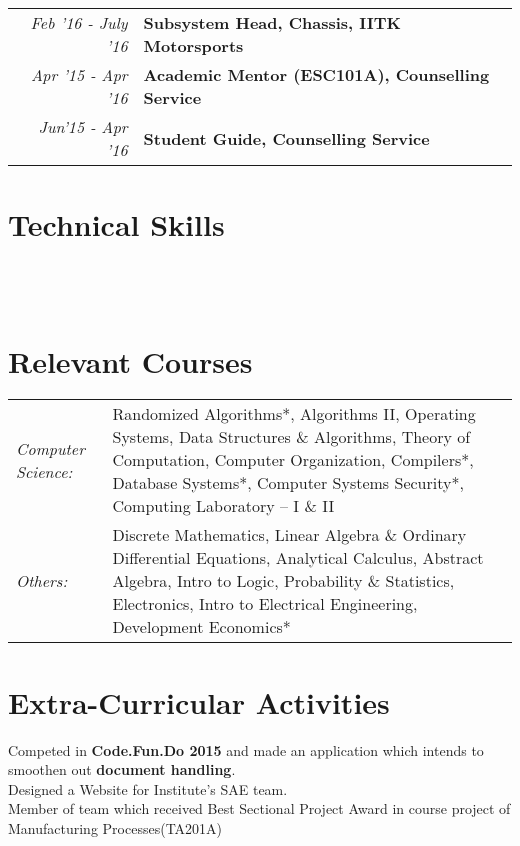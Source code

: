 \documentclass[a4paper]{norm-resume}
\begin{document}
    \begin{tabular}{r|p{16cm}}

    \normalsize\emph{Feb '16 - July '16} & \normalsize\textbf{Subsystem Head, Chassis, IITK Motorsports}\\
    \normalsize\emph{Apr '15 - Apr '16} & \normalsize\textbf{Academic Mentor (ESC101A), Counselling Service}\\
    \normalsize\emph{Jun'15 - Apr '16} & \normalsize\textbf{Student Guide, Counselling Service}
    \end{tabular}


\section{Technical Skills \hrulefill}

 \hfill {} \\
 \hfill {} \\
 \hfill {}


\section{Relevant Courses \hrulefill}

	\begin{tabular}{lp{15cm}}

	\normalsize\emph{Computer Science:} & \small{Randomized Algorithms*, Algorithms II, Operating Systems, Data Structures \& Algorithms, Theory of Computation, Computer Organization, Compilers*, Database Systems*, Computer Systems Security*, Computing Laboratory – I \& II} \\
	\normalsize\emph{Others:} & \small{Discrete Mathematics, Linear Algebra \& Ordinary Differential Equations, Analytical Calculus, Abstract Algebra, Intro to Logic, Probability \& Statistics, Electronics, Intro to Electrical Engineering}, Development Economics*
	\end{tabular}

\section{Extra-Curricular Activities \hrulefill}
    Competed in \textbf{Code.Fun.Do 2015} and made an application which intends to smoothen out \textbf{document handling}. \\
    Designed a Website for Institute’s SAE team. \\
    Member of team which received Best Sectional Project Award in course project of Manufacturing Processes(TA201A)
\end{document}

